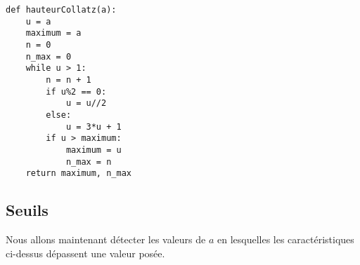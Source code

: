 \begin{Answer} 
\begin{lstlisting}
def hauteurCollatz(a):
    u = a
    maximum = a
    n = 0
    n_max = 0
    while u > 1:
        n = n + 1
        if u%2 == 0:
            u = u//2
        else:
            u = 3*u + 1
        if u > maximum:
            maximum = u
            n_max = n
    return maximum, n_max
\end{lstlisting}
\end{Answer}
\subsection{Seuils} 
Nous allons maintenant détecter les valeurs de $a$ en lesquelles les caractéristiques ci-dessus dépassent une valeur posée.

